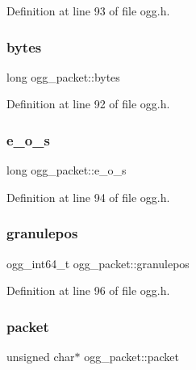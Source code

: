 Definition at line 93 of file ogg.\+h.

\mbox{\label{structogg__packet_a4438269ce6025d8817865ae66d5881f1}} 
\subsubsection{\texorpdfstring{bytes}{bytes}}
{\footnotesize\ttfamily long ogg\+\_\+packet\+::bytes}



Definition at line 92 of file ogg.\+h.

\mbox{\label{structogg__packet_aa367e7c5425c5f65cbd126b82dfc72e8}} 
\subsubsection{\texorpdfstring{e\_o\_s}{e\_o\_s}}
{\footnotesize\ttfamily long ogg\+\_\+packet\+::e\+\_\+o\+\_\+s}



Definition at line 94 of file ogg.\+h.

\mbox{\label{structogg__packet_a838d9a000e08bae982409bc2734fc566}} 
\subsubsection{\texorpdfstring{granulepos}{granulepos}}
{\footnotesize\ttfamily ogg\+\_\+int64\+\_\+t ogg\+\_\+packet\+::granulepos}



Definition at line 96 of file ogg.\+h.

\mbox{\label{structogg__packet_a57e7096985ec8766dce415e248767c32}} 
\subsubsection{\texorpdfstring{packet}{packet}}
{\footnotesize\ttfamily unsigned char$\ast$ ogg\+\_\+packet\+::packet}



